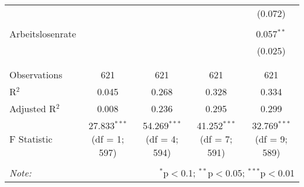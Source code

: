 \begin{table}[!htbp]
\begin{tabular}{@{\extracolsep{5pt}}lcccc}
  &  &  &  & (0.072) \\ 
  & & & & \\ 
 Arbeitslosenrate &  &  &  & 0.057$^{**}$ \\ 
  &  &  &  & (0.025) \\ 
  & & & & \\ 
\hline \\[-1.8ex] 
Observations & 621 & 621 & 621 & 621 \\ 
R$^{2}$ & 0.045 & 0.268 & 0.328 & 0.334 \\ 
Adjusted R$^{2}$ & 0.008 & 0.236 & 0.295 & 0.299 \\ 
F Statistic & 27.833$^{***}$ (df = 1; 597) & 54.269$^{***}$ (df = 4; 594) & 41.252$^{***}$ (df = 7; 591) & 32.769$^{***}$ (df = 9; 589) \\ 
\hline 
\hline \\[-1.8ex] 
\textit{Note:}  & \multicolumn{4}{r}{$^{*}$p$<$0.1; $^{**}$p$<$0.05; $^{***}$p$<$0.01} \\ 
\end{tabular} 
\end{table} 
